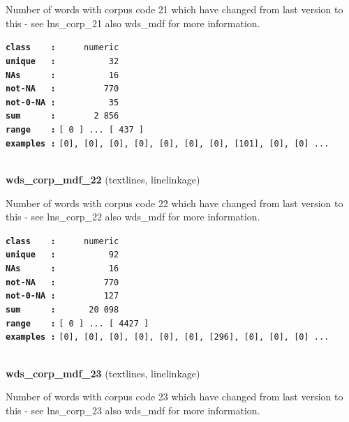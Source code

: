 \documentclass[]{article}
\begin{document}
Number of words with corpus code 21 which have changed from last version
to this - see lns\_corp\_21 also wds\_mdf for more information.

\textbf{\texttt{class\ \ \ \ :}} \texttt{~~~~~numeric}\\
\textbf{\texttt{unique\ \ \ :}} \texttt{~~~~~~~~~~32}\\
\textbf{\texttt{NAs\ \ \ \ \ \ :}} \texttt{~~~~~~~~~~16}\\
\textbf{\texttt{not-NA\ \ \ :}} \texttt{~~~~~~~~~770}\\
\textbf{\texttt{not-0-NA\ :}} \texttt{~~~~~~~~~~35}\\
\textbf{\texttt{sum\ \ \ \ \ \ :}} \texttt{~~~~~~~2~856}\\
\textbf{\texttt{range\ \ \ \ :}}
\texttt{{[}\ 0\ {]}\ ...\ {[}\ 437\ {]}}\\
\textbf{\texttt{examples\ :}}
\texttt{{[}0{]},\ {[}0{]},\ {[}0{]},\ {[}0{]},\ {[}0{]},\ {[}0{]},\ {[}0{]},\ {[}101{]},\ {[}0{]},\ {[}0{]}\ ...}\\

~

\textbf{wds\_corp\_mdf\_22} (textlines, linelinkage)

Number of words with corpus code 22 which have changed from last version
to this - see lns\_corp\_22 also wds\_mdf for more information.

\textbf{\texttt{class\ \ \ \ :}} \texttt{~~~~~numeric}\\
\textbf{\texttt{unique\ \ \ :}} \texttt{~~~~~~~~~~92}\\
\textbf{\texttt{NAs\ \ \ \ \ \ :}} \texttt{~~~~~~~~~~16}\\
\textbf{\texttt{not-NA\ \ \ :}} \texttt{~~~~~~~~~770}\\
\textbf{\texttt{not-0-NA\ :}} \texttt{~~~~~~~~~127}\\
\textbf{\texttt{sum\ \ \ \ \ \ :}} \texttt{~~~~~~20~098}\\
\textbf{\texttt{range\ \ \ \ :}}
\texttt{{[}\ 0\ {]}\ ...\ {[}\ 4427\ {]}}\\
\textbf{\texttt{examples\ :}}
\texttt{{[}0{]},\ {[}0{]},\ {[}0{]},\ {[}0{]},\ {[}0{]},\ {[}0{]},\ {[}296{]},\ {[}0{]},\ {[}0{]},\ {[}0{]}\ ...}\\

~

\textbf{wds\_corp\_mdf\_23} (textlines, linelinkage)

Number of words with corpus code 23 which have changed from last version
to this - see lns\_corp\_23 also wds\_mdf for more information.
\end{document}
